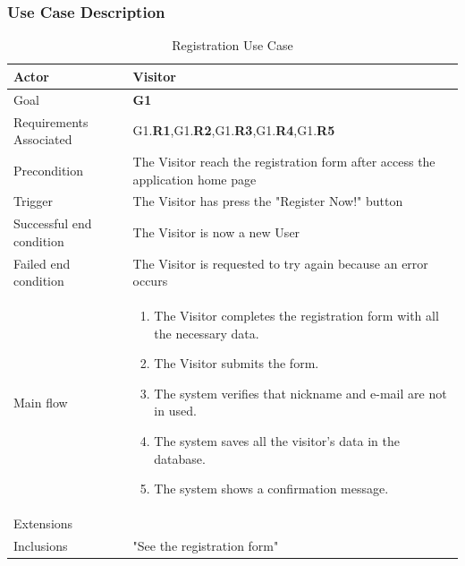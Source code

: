 \subsubsection{Use Case Description}
\newline
\begin{table}[htb]
\begin{center}
\renewcommand{\arraystretch}{1.5}
\begin{tabular}{|l|p{}|}
\hline
Actor & Visitor \\ \hline
Goal & \textbf{G1} \\ \hline
Requirements Associated & G1.\textbf{R1},G1.\textbf{R2},G1.\textbf{R3},G1.\textbf{R4},G1.\textbf{R5} \\ \hline
Precondition & The Visitor reach the registration form after access the application home page \\ \hline
Trigger & The Visitor has press the "Register Now!" button \\ \hline
Successful end condition & The Visitor is now a new User \\ \hline
Failed end condition & The Visitor is requested to try again because an error occurs \\ \hline
Main flow & \begin{minipage}[t]{0.6\textwidth}
\begin{enumerate}
\addtolength{\itemindent}{0.5cm}
\item The Visitor completes the registration form with all the necessary data.
\item The Visitor submits the form.
\item The system verifies that nickname and e-mail are not in used.
\item The system saves all the visitor's data in the database.
\item The system shows a confirmation message.
\end{enumerate}
\end{minipage} \\ \hline
Extensions & \\ \hline
Inclusions & "See the registration form" \\ \hline
\end{tabular}
\caption{Registration Use Case}
\end{center}
\end{table}
\clearpage


